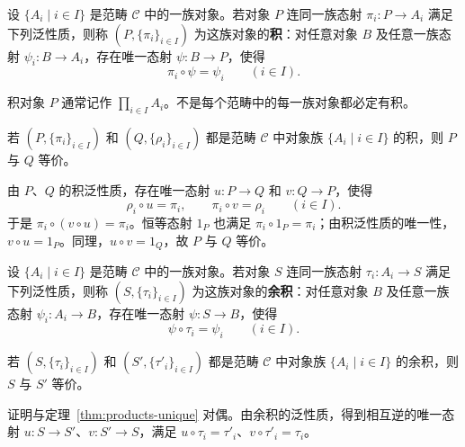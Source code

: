 \begin{definition}[积]\label{def:category-product}
设 $\{A_i\mid i\in I\}$ 是范畴 $\mathcal C$ 中的一族对象。若对象 $P$ 连同一族态射 $\pi_i:P\to A_i$ 满足下列泛性质，则称 $(P,\{\pi_i\}_{i\in I})$ 为这族对象的\textbf{积}：对任意对象 $B$ 及任意一族态射 $\psi_i:B\to A_i$，存在唯一态射 $\psi:B\to P$，使得
\[
  \pi_i\circ\psi=\psi_i\qquad(i\in I).
\]
\end{definition}

\begin{purplenote}
积对象 $P$ 通常记作 $\prod_{i\in I}A_i$。不是每个范畴中的每一族对象都必定有积。
\end{purplenote}

\begin{theorem}\label{thm:products-unique}
若 $(P,\{\pi_i\}_{i\in I})$ 和 $(Q,\{\rho_i\}_{i\in I})$ 都是范畴 $\mathcal C$ 中对象族 $\{A_i\mid i\in I\}$ 的积，则 $P$ 与 $Q$ 等价。
\end{theorem}

\begin{purpleproof}
由 $P$、$Q$ 的积泛性质，存在唯一态射 $u:P\to Q$ 和 $v:Q\to P$，使得
\[
  \rho_i\circ u=\pi_i,\qquad \pi_i\circ v=\rho_i\qquad(i\in I).
\]
于是 $\pi_i\circ(v\circ u)=\pi_i$。恒等态射 $1_P$ 也满足 $\pi_i\circ1_P=\pi_i$；由积泛性质的唯一性，$v\circ u=1_P$。同理，$u\circ v=1_Q$，故 $P$ 与 $Q$ 等价。
\end{purpleproof}

\begin{definition}[余积]\label{def:category-coproduct}
设 $\{A_i\mid i\in I\}$ 是范畴 $\mathcal C$ 中的一族对象。若对象 $S$ 连同一族态射 $\tau_i:A_i\to S$ 满足下列泛性质，则称 $(S,\{\tau_i\}_{i\in I})$ 为这族对象的\textbf{余积}：对任意对象 $B$ 及任意一族态射 $\psi_i:A_i\to B$，存在唯一态射 $\psi:S\to B$，使得
\[
  \psi\circ\tau_i=\psi_i\qquad(i\in I).
\]
\end{definition}

\begin{theorem}\label{thm:coproducts-unique}
若 $(S,\{\tau_i\}_{i\in I})$ 和 $(S',\{\tau'_i\}_{i\in I})$ 都是范畴 $\mathcal C$ 中对象族 $\{A_i\mid i\in I\}$ 的余积，则 $S$ 与 $S'$ 等价。
\end{theorem}

\begin{purpleproof}
证明与定理~\ref{thm:products-unique} 对偶。由余积的泛性质，得到相互逆的唯一态射 $u:S\to S'$、$v:S'\to S$，满足 $u\circ\tau_i=\tau'_i$、$v\circ\tau'_i=\tau_i$。
\end{purpleproof}

